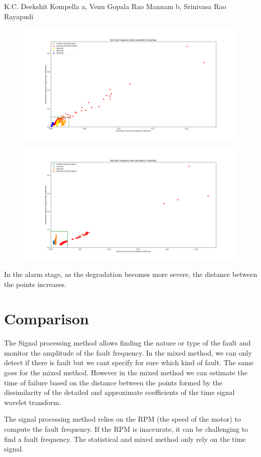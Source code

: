 \documentclass[11pt, oneside]{article}   	%
\begin{document}
K.C. Deekshit Kompella a, Venu Gopala Rao Mannam b, Srinivasa Rao Rayapudi
\begin{figure}[H] %
   \centering
   \includegraphics[width=6in]{mixed_method_bpfo.png} 
   \caption{}
   \label{fig:example}
\end{figure}
\begin{figure}[H] %
   \centering
   \includegraphics[width=6in]{mixed_method_bpfi.png} 
   \caption{}
   \label{fig:example}
\end{figure}
In the alarm stage, as the degradation becomes more severe, the distance between the points increases.
\section{Comparison}
The Signal processing method allows finding the nature or type of the fault and monitor the amplitude of the fault frequency. In the mixed method, we can only detect if there is fault but we cant specify for sure which kind of fault. The same goes for the mixed method. However in the mixed method we can estimate the time of failure based on the distance between the points formed by the dissimilarity of the detailed and approximate coefficients of the time signal wavelet transform.
\begin{flushleft}
The signal processing method relies on the RPM (the speed of the motor) to compute the fault frequency. If the RPM is inaccurate, it can be challenging to find a fault frequency. The statistical and mixed method only rely on the time signal. 
\end{flushleft}
\end{document}

